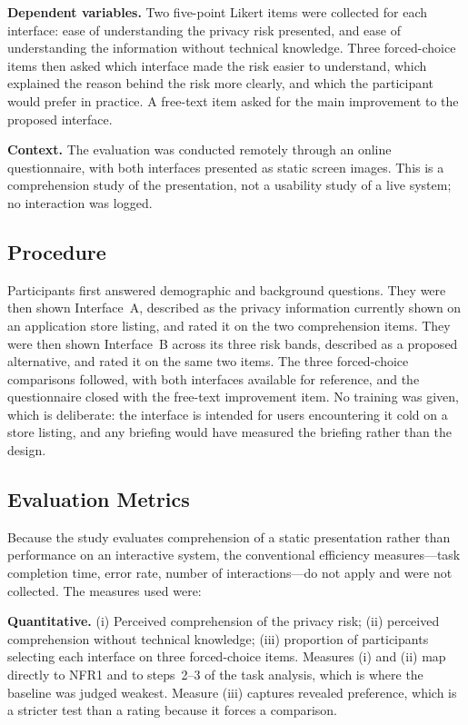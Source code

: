 \documentclass[sigconf]{acmart}
\begin{document}
\textbf{Dependent variables.} Two five-point Likert items were collected
for each interface: ease of understanding the privacy risk presented, and
ease of understanding the information without technical knowledge. Three
forced-choice items then asked which interface made the risk easier to
understand, which explained the reason behind the risk more clearly, and
which the participant would prefer in practice. A free-text item asked for
the main improvement to the proposed interface.

\textbf{Context.} The evaluation was conducted remotely through an online
questionnaire, with both interfaces presented as static screen images. This
is a comprehension study of the presentation, not a usability study of a
live system; no interaction was logged.

\subsection{Procedure}

Participants first answered demographic and background questions. They were
then shown Interface~A, described as the privacy information currently
shown on an application store listing, and rated it on the two
comprehension items. They were then shown Interface~B across its three risk
bands, described as a proposed alternative, and rated it on the same two
items. The three forced-choice comparisons followed, with both interfaces
available for reference, and the questionnaire closed with the free-text
improvement item. No training was given, which is deliberate: the interface
is intended for users encountering it cold on a store listing, and any
briefing would have measured the briefing rather than the design.

\subsection{Evaluation Metrics}

Because the study evaluates comprehension of a static presentation rather
than performance on an interactive system, the conventional efficiency
measures---task completion time, error rate, number of interactions---do
not apply and were not collected. The measures used were:

\textbf{Quantitative.} (i) Perceived comprehension of the privacy risk;
(ii) perceived comprehension without technical knowledge; (iii) proportion
of participants selecting each interface on three forced-choice items.
Measures (i) and (ii) map directly to NFR1 and to steps~2--3 of the task
analysis, which is where the baseline was judged weakest. Measure (iii)
captures revealed preference, which is a stricter test than a rating
because it forces a comparison.
\end{document}
